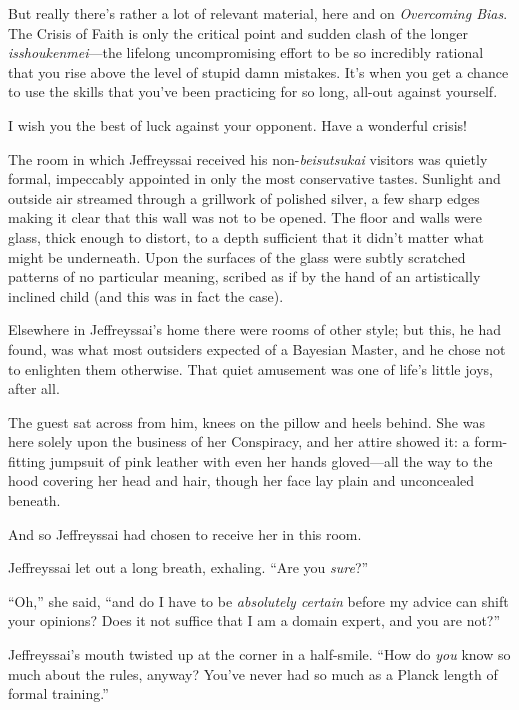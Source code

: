 {
 But really there's rather a lot of relevant
material, here and on \textit{Overcoming Bias}. The Crisis of Faith is
only the critical point and sudden clash of the longer
\textit{isshoukenmei}{}---the lifelong uncompromising effort to be so
incredibly rational that you rise above the level of stupid damn
mistakes. It's when you get a chance to use the skills
that you've been practicing for so long, all-out
against yourself.}

{
 I wish you the best of luck against your opponent. Have a
wonderful crisis!}

\myendsectiontext


{
 The room in which Jeffreyssai received his
non-\textit{beisutsukai} visitors was quietly formal, impeccably
appointed in only the most conservative tastes. Sunlight and outside
air streamed through a grillwork of polished silver, a few sharp edges
making it clear that this wall was not to be opened. The floor and
walls were glass, thick enough to distort, to a depth sufficient that
it didn't matter what might be underneath. Upon the
surfaces of the glass were subtly scratched patterns of no particular
meaning, scribed as if by the hand of an artistically inclined child
(and this was in fact the case). }

{
 Elsewhere in Jeffreyssai's home there were rooms
of other style; but this, he had found, was what most outsiders
expected of a Bayesian Master, and he chose not to enlighten them
otherwise. That quiet amusement was one of life's
little joys, after all.}

{
 The guest sat across from him, knees on the pillow and heels
behind. She was here solely upon the business of her Conspiracy, and
her attire showed it: a form-fitting jumpsuit of pink leather with even
her hands gloved---all the way to the hood covering her head and hair,
though her face lay plain and unconcealed beneath.}

{
 And so Jeffreyssai had chosen to receive her in this room.}

{
 Jeffreyssai let out a long breath, exhaling.
``Are you \textit{sure}?''}

{
 ``Oh,'' she said,
``and do I have to be \textit{absolutely certain}
before my advice can shift your opinions? Does it not suffice that I am
a domain expert, and you are not?''}

{
 Jeffreyssai's mouth twisted up at the corner in a
half-smile. ``How do \textit{you} know so much about
the rules, anyway? You've never had so much as a Planck
length of formal training.''}

